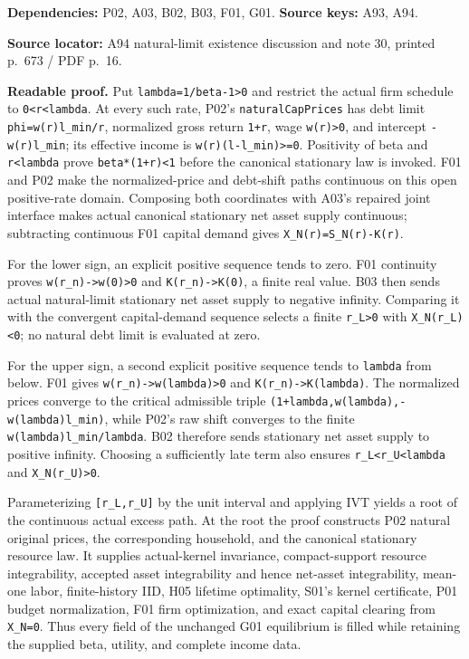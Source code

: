 \documentclass[
  11pt,
]{article}
\let\LedgerOriginalTexttt\texttt
\renewcommand{\texttt}[1]{{\small\LedgerOriginalTexttt{#1}}}
\begin{document}
\textbf{Dependencies:} P02, A03, B02, B03, F01, G01. \textbf{Source
keys:} A93, A94.

\textbf{Source locator:} A94 natural-limit existence discussion and note
30, printed p.~673 / PDF p.~16.

\textbf{Readable proof.} Put \texttt{lambda=1/beta-1\textgreater{}0} and
restrict the actual firm schedule to
\texttt{0\textless{}r\textless{}lambda}. At every such rate, P02's
\texttt{naturalCapPrices} has debt limit \texttt{phi=w(r)l\_min/r},
normalized gross return \texttt{1+r}, wage \texttt{w(r)\textgreater{}0},
and intercept \texttt{-w(r)l\_min}; its effective income is
\texttt{w(r)(l-l\_min)\textgreater{}=0}. Positivity of beta and
\texttt{r\textless{}lambda} prove \texttt{beta*(1+r)\textless{}1} before
the canonical stationary law is invoked. F01 and P02 make the
normalized-price and debt-shift paths continuous on this open
positive-rate domain. Composing both coordinates with A03's repaired
joint interface makes actual canonical stationary net asset supply
continuous; subtracting continuous F01 capital demand gives
\texttt{X\_N(r)=S\_N(r)-K(r)}.

For the lower sign, an explicit positive sequence tends to zero. F01
continuity proves \texttt{w(r\_n)-\textgreater{}w(0)\textgreater{}0} and
\texttt{K(r\_n)-\textgreater{}K(0)}, a finite real value. B03 then sends
actual natural-limit stationary net asset supply to negative infinity.
Comparing it with the convergent capital-demand sequence selects a
finite \texttt{r\_L\textgreater{}0} with
\texttt{X\_N(r\_L)\textless{}0}; no natural debt limit is evaluated at
zero.

For the upper sign, a second explicit positive sequence tends to
\texttt{lambda} from below. F01 gives
\texttt{w(r\_n)-\textgreater{}w(lambda)\textgreater{}0} and
\texttt{K(r\_n)-\textgreater{}K(lambda)}. The normalized prices converge
to the critical admissible triple
\texttt{(1+lambda,w(lambda),-w(lambda)l\_min)}, while P02's raw shift
converges to the finite \texttt{w(lambda)l\_min/lambda}. B02 therefore
sends stationary net asset supply to positive infinity. Choosing a
sufficiently late term also ensures
\texttt{r\_L\textless{}r\_U\textless{}lambda} and
\texttt{X\_N(r\_U)\textgreater{}0}.

Parameterizing \texttt{{[}r\_L,r\_U{]}} by the unit interval and
applying IVT yields a root of the continuous actual excess path. At the
root the proof constructs P02 natural original prices, the corresponding
household, and the canonical stationary resource law. It supplies
actual-kernel invariance, compact-support resource integrability,
accepted asset integrability and hence net-asset integrability, mean-one
labor, finite-history IID, H05 lifetime optimality, S01's kernel
certificate, P01 budget normalization, F01 firm optimization, and exact
capital clearing from \texttt{X\_N=0}. Thus every field of the unchanged
G01 equilibrium is filled while retaining the supplied beta, utility,
and complete income data.
\end{document}

